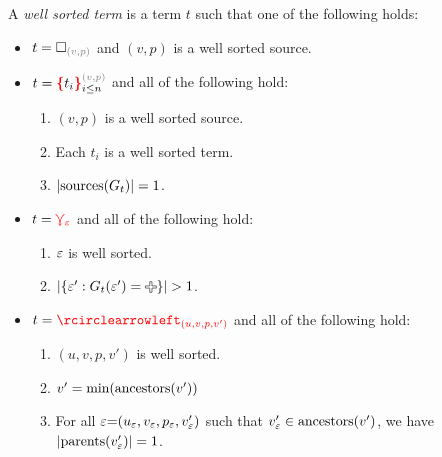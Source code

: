 \begin{definition}
  A \emph{well sorted term} is a term $t$ such that one of the following holds:
  \begin{itemize}

    \item $t = \emptyHole{v}{p}$ and $(v, p)$ is a well sorted source.

    \item $t = \conflictHole[i \leq n]{t_i}{v}{p}$ and all of the following hold:
      \begin{enumerate}
        \item $(v, p)$ is a well sorted source.
        \item Each $t_i$ is a well sorted term.
        \item $\left\lvert\text{sources}\mathopen{}\left(G_t\right)\mathclose{}\right\rvert = 1$.
      \end{enumerate}

    \item $t = \textcolor{red}{\curlyveedownarrow_{\varepsilon}}$ and all of the following hold:
      \begin{enumerate}
        \item $\varepsilon$ is well sorted.
        \item $\SizeOf{\SetOf{\e' \SuchThat{G_t(\e') = \Plus}}} > 1$.
      \end{enumerate}

    \item $t = \cycleVertex{(u, v, p, v')}$ and all of the following hold:
      \begin{enumerate}
        \item $(u, v, p, v')$ is well sorted.
        \item $v' = \operatorname{\text{min}}\mathopen{}\left(\operatorname{\text{ancestors}}\mathopen{}\left(v'\right)\mathclose{}\right)\mathclose{}$
        \item For all $\varepsilon{=}(u_{\varepsilon}, v_{\varepsilon}, p_{\varepsilon}, v_{\varepsilon}')$
          such that $v_{\varepsilon}' \in \operatorname{\text{ancestors}}\mathopen{}\left(v'\right)\mathclose{}$,
          we have $\left\lvert\operatorname{\text{parents}}\mathopen{}\left(v_{\varepsilon}'\right)\mathclose{}\right\rvert = 1$.
      \end{enumerate}


\end{itemize}
\end{definition}
